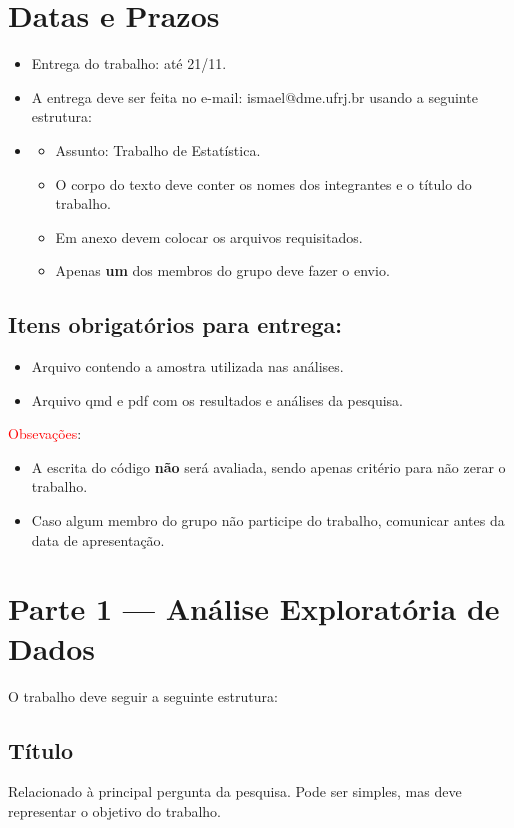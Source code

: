 \documentclass[12pt]{article}
\begin{document}
\section*{Datas e Prazos}
\begin{itemize}
    \item Entrega do trabalho: até 21/11.
    \item A entrega deve ser feita no e-mail: ismael@dme.ufrj.br usando a seguinte estrutura:
    \item \begin{itemize}
        \item Assunto: Trabalho de Estatística. 
        \item O corpo do texto deve conter os nomes dos integrantes e o título do trabalho. 
        \item Em anexo devem colocar os arquivos requisitados. 
        \item Apenas \textbf{um} dos membros do grupo deve fazer o envio.  
    \end{itemize}
\end{itemize}

\subsection*{Itens obrigatórios para entrega:}

\begin{itemize}
    \item Arquivo contendo a amostra utilizada nas análises. 
    \item Arquivo qmd e pdf com os resultados e análises da pesquisa.
\end{itemize}

\textcolor{red}{Obsevações}:
\begin{itemize}
    \item A escrita do código \textbf{não} será avaliada, sendo apenas critério para não zerar o trabalho. 
    \item Caso algum membro do grupo não participe do trabalho, comunicar antes da data de apresentação. 
\end{itemize}

\section*{Parte 1 — Análise Exploratória de Dados}
O trabalho deve seguir a seguinte estrutura:

\subsection*{Título}
Relacionado à principal pergunta da pesquisa. Pode ser simples, mas deve representar o objetivo do trabalho.
\end{document}
